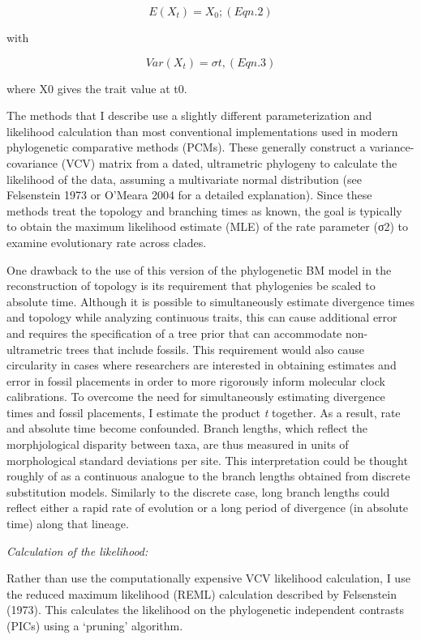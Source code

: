 \documentclass[12pt]{article}
\begin{document}
\[ E(X_t) = X_0;   (Eqn. 2) \]

with

\[Var(X_t) =  \sigma t,  (Eqn. 3)\]

where X0 gives the trait value at t0.

The methods that I describe use a slightly different parameterization
and likelihood calculation than most conventional implementations used
in modern phylogenetic comparative methods (PCMs). These generally
construct a variance-covariance (VCV) matrix from a dated, ultrametric
phylogeny to calculate the likelihood of the data, assuming a
multivariate normal distribution (see Felsenstein 1973 or O'Meara 2004
for a detailed explanation). Since these methods treat the topology and
branching times as known, the goal is typically to obtain the maximum
likelihood estimate (MLE) of the rate parameter (σ2) to examine
evolutionary rate across clades.

One drawback to the use of this version of the phylogenetic BM model in
the reconstruction of topology is its requirement that phylogenies be
scaled to absolute time. Although it is possible to simultaneously
estimate divergence times and topology while analyzing continuous
traits, this can cause additional error and requires the specification
of a tree prior that can accommodate non-ultrametric trees that include
fossils. This requirement would also cause circularity in cases where
researchers are interested in obtaining estimates and error in fossil
placements in order to more rigorously inform molecular clock
calibrations. To overcome the need for simultaneously estimating
divergence times and fossil placements, I estimate the product
\sigma\emph{t} together. As a result, rate and absolute time become
confounded. Branch lengths, which reflect the morphjological disparity
between taxa, are thus measured in units of morphological standard
deviations per site. This interpretation could be thought roughly of as
a continuous analogue to the branch lengths obtained from discrete
substitution models. Similarly to the discrete case, long branch lengths
could reflect either a rapid rate of evolution or a long period of
divergence (in absolute time) along that lineage.

\emph{Calculation of the likelihood:}

Rather than use the computationally expensive VCV likelihood
calculation, I use the reduced maximum likelihood (REML) calculation
described by Felsenstein (1973). This calculates the likelihood on the
phylogenetic independent contrasts (PICs) using a `pruning' algorithm.
\end{document}
